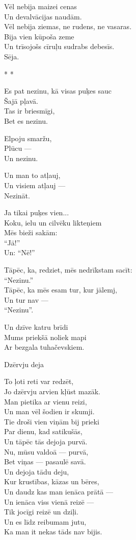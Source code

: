 \documentclass[14pt]{extarticle}
\begin{document}
Vēl nebija maizei cenas\\
Un devalvācijas naudām.\\
Vēl nebija ziemas, ne rudens, ne vasaras.\\
Bija vien kūpoša zeme\\
Un trīsojošs cīruļu sudrabs debesīs.\\
Sēja.


\newpage

{\large \sc * * *}

Es pat nezinu, kā visas puķes sauc\\
Šajā pļavā.\\
Tas ir briesmīgi,\\
Bet es nezinu.

Elpoju smaržu,\\
Plūcu ---\\
Un nezinu.

Un man to atļauj,\\
Un visiem atļauj ---\\
Nezināt.

Ja tikai puķes vien...\\
Koku, ielu un cilvēku likteņiem\\
Mēs bieži sakām:\\
``Jā!''\\
Un: ``Nē!''

Tāpēc, ka, redziet, mēs nedrīkstam sacīt:\\
``Nezinu.''\\
Tāpēc, ka mēs esam tur, kur jālemj,\\
Un tur nav ---\\
``Nezinu''.

Un dzīve katru brīdi\\
Mums priekšā noliek mapi\\
Ar bezgala tuhačevskiem.


\newpage

{\large \sc Dzērvju deja}

To ļoti reti var redzēt,\\
Jo dzērvju arvien kļūst mazāk.\\
Man pietika ar vienu reizi,\\
Un man vēl šodien ir skumji.\\
Tie droši vien viņām bij prieki\\
Par dienu, kad satikušās,\\
Un tāpēc tās dejoja purvā.\\
Nu, mūsu valdoā --- purvā,\\
Bet viņas --- pasaulē savā.\\
Un dejoja tādu deju,\\
Kur krustības, kāzas un bēres,\\
Un daudz kas man ienāca prātā ---\\
Un ienāca viss vienā reizē ---\\
Tik jocīgi reizē un dziļi.\\
Un es līdz reibumam jutu,\\
Ka man it nekas tāds nav bijis.
\end{document}
